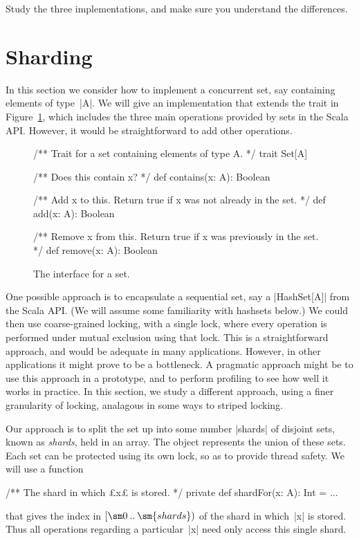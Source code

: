 \begin{instruction}
Study the three implementations, and make sure you understand the differences.
\end{instruction}


\section{Sharding}
\label{sec:sharding}

In this section we  consider how to implement a concurrent set, say
containing elements of type~|A|.  We will give an implementation that extends
the trait in Figure~\ref{fig:Set-trait}, which includes the three main
operations provided by sets in the Scala API{}.  However, it would be
straightforward to add other operations.


\begin{figure}
\begin{scala}
/** Trait for a set containing elements of type A. */
trait Set[A]{
  /** Does this contain x? */
  def contains(x: A): Boolean

  /** Add x to this.  Return true if x was not already in the set. */
  def add(x: A): Boolean 

  /** Remove x from this.  Return true if x was previously in the set. */
  def remove(x: A): Boolean
}
\end{scala}
\caption{The interface for a set.}
\label{fig:Set-trait}
\end{figure}


One possible approach is to encapsulate a sequential set, say a |HashSet[A]|
from the Scala API{}.  (We will assume some familiarity with hashsets below.)
We could then use coarse-grained locking, with a single lock, where every
operation is performed under mutual exclusion using that lock.  This is a
straightforward approach, and would be adequate in many applications.
However, in other applications it might prove to be a bottleneck.  A pragmatic
approach might be to use this approach in a prototype, and to perform
profiling to see how well it works in practice.  In this section, we study a
different approach, using a finer granularity of locking, analagous in some
ways to striped locking.

Our approach is to split the set up into some number |shards| of disjoint
sets, known as \emph{shards}, held in an array.  The object represents the
union of these sets.  Each set can be protected using its own lock, so as to
provide thread safety.  We will use a function
%
\begin{scala}
  /** The shard in which £x£ is stored. */ 
  private def shardFor(x: A): Int = ...
\end{scala}
%
that gives the index in $\interval{\sm 0}{\sm{shards}}$ of the shard in
which~|x| is stored.  Thus all operations regarding a particular~|x| need only
access this single shard.  

